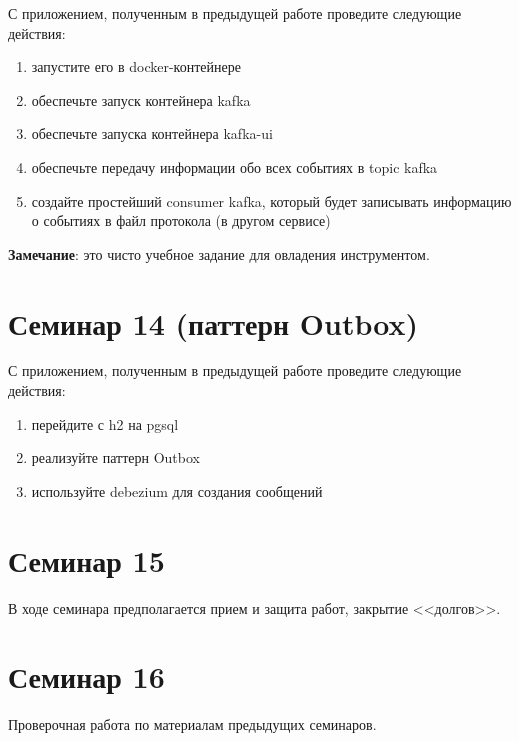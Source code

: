 \documentclass[12pt]{article}
\begin{document}
С приложением, полученным в предыдущей работе проведите следующие действия:

\begin{enumerate}
    \item запустите его в docker-контейнере
    \item обеспечьте запуск контейнера kafka
    \item обеспечьте запуска контейнера kafka-ui
    \item обеспечьте передачу информации обо всех событиях в topic kafka 
    \item создайте простейший consumer kafka, который будет записывать информацию о событиях в 
    файл протокола (в другом сервисе)
\end{enumerate}

\textbf{Замечание}: это чисто учебное задание для овладения инструментом.

\section{Семинар 14 (паттерн Outbox)}

С приложением, полученным в предыдущей работе проведите следующие действия:

\begin{enumerate}
    \item перейдите с h2 на pgsql
    \item реализуйте паттерн Outbox
    \item используйте debezium для создания сообщений
\end{enumerate}


\section{Семинар 15}

В ходе семинара предполагается прием и защита работ, закрытие <<долгов>>.

\section{Семинар 16}

Проверочная работа по материалам предыдущих семинаров.
\end{document}
